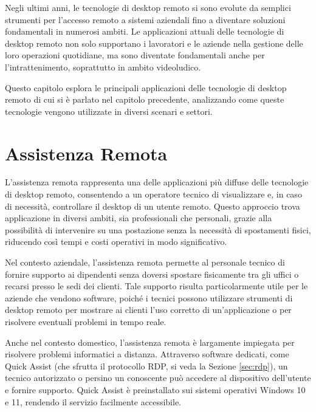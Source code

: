 \documentclass[12pt,a4paper,openright,twoside]{book}
\begin{document}
Negli ultimi anni, le tecnologie di desktop remoto si sono evolute da semplici strumenti per l’accesso remoto a sistemi aziendali fino a diventare soluzioni fondamentali in numerosi ambiti. Le applicazioni attuali delle tecnologie di desktop remoto non solo supportano i lavoratori e le aziende nella gestione delle loro operazioni quotidiane, ma sono diventate fondamentali anche per l’intrattenimento, soprattutto in ambito videoludico.

Questo capitolo esplora le principali applicazioni delle tecnologie di desktop remoto di cui si è parlato nel capitolo precedente, analizzando come queste tecnologie vengono utilizzate in diversi scenari e settori.


\section{Assistenza Remota}
\label{sec:remote-assistance}

L'assistenza remota rappresenta una delle applicazioni più diffuse delle tecnologie di desktop remoto, consentendo a un operatore tecnico di visualizzare e, in caso di necessità, controllare il desktop di un utente remoto. Questo approccio trova applicazione in diversi ambiti, sia professionali che personali, grazie alla possibilità di intervenire su una postazione senza la necessità di spostamenti fisici, riducendo così tempi e costi operativi in modo significativo.

Nel contesto aziendale, l'assistenza remota permette al personale tecnico di fornire supporto ai dipendenti senza doversi spostare fisicamente tra gli uffici o recarsi presso le sedi dei clienti. Tale supporto risulta particolarmente utile per le aziende che vendono software, poiché i tecnici possono utilizzare strumenti di desktop remoto per mostrare ai clienti l'uso corretto di un'applicazione o per risolvere eventuali problemi in tempo reale. 

Anche nel contesto domestico, l’assistenza remota è largamente impiegata per risolvere problemi informatici a distanza. Attraverso software dedicati, come Quick Assist (che sfrutta il protocollo RDP, si veda la Sezione \ref{sec:rdp}), un tecnico autorizzato o persino un conoscente può accedere al dispositivo dell’utente e fornire supporto. Quick Assist è preinstallato sui sistemi operativi Windows 10 e 11, rendendo il servizio facilmente accessibile.

\end{document}
